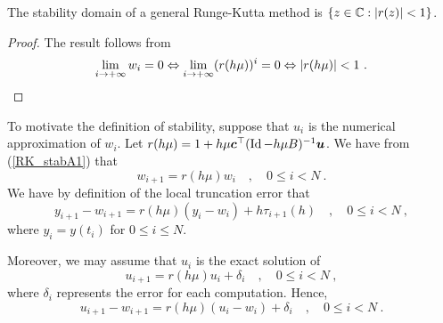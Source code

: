 \begin{cor}
The stability domain of a general Runge-Kutta method is
$\{ z \in \mathbb{C} : |r(z)| < 1 \}$.
\label{RKstabReg}
\end{cor}

\begin{proof}
The result follows from
\[
\lim_{i\rightarrow +\infty} w_i = 0
\Leftrightarrow \lim_{i\rightarrow +\infty}(r(h\mu))^i = 0
\Leftrightarrow |r(h\mu)| < 1 \ .   \qedhere
\]
\end{proof}

\begin{rmk}
To motivate the definition of stability, suppose that $u_i$ is the
numerical approximation of $w_i$.  Let
$r(h\mu) = 1 + h\mu \bm{c}^{\top}(\operatorname{Id}-h\mu B)^{-1}\bm{u}$.  We have from
(\ref{RK_stabA1}) that
\[
 w_{i+1} = r(h\mu) w_i \quad , \quad 0\leq i < N \ .
\]
We have by definition of the local truncation error that
\begin{equation}\label{RKstabMotivA}
y_{i+1}- w_{i+1} = r(h\mu) (y_i- w_i) + h \tau_{i+1}(h) \quad ,
\quad 0\leq i < N \ ,
\end{equation}
where $y_i = y(t_i)$ for $0\leq i \leq N$.

Moreover, we may assume that $u_i$ is the exact solution of
\[
  u_{i+1} = r(h\mu) u_i + \delta_i \quad , \quad 0\leq i < N \ ,
\]
where $\delta_i$ represents the error for each computation.  Hence,
\begin{equation}\label{RKstabMotivB}
  u_{i+1} - w_{i+1} = r(h\mu) (u_i -w_i) + \delta_i \quad , \quad 0\leq i < N \ .
\end{equation}


\end{rmk}
